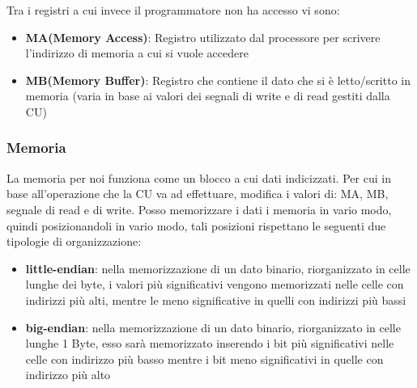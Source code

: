 Tra i registri a cui invece il programmatore non ha accesso vi sono:
\begin{itemize}
    \item \textbf{MA(Memory Access)}: Registro utilizzato dal processore per scrivere l'indirizzo di memoria a cui si vuole accedere
    \item \textbf{MB(Memory Buffer)}: Registro che contiene il dato che si è letto/scritto in memoria (varia in base ai valori dei segnali di write e di read gestiti dalla CU)
\end{itemize}

\subsubsection{Memoria}
La memoria per noi funziona come un blocco a cui dati indicizzati. Per cui in base all'operazione che la CU va ad effettuare, modifica i valori di: MA, MB, segnale di read e di write.
Posso memorizzare i dati i memoria in vario modo, quindi posizionandoli in vario modo, tali posizioni rispettano le seguenti due tipologie di organizzazione:
\begin{itemize}
    \item \textbf{little-endian}: nella memorizzazione di un dato binario, riorganizzato in celle lunghe dei byte, i valori più significativi vengono memorizzati nelle celle con indirizzi più alti, mentre le meno significative in quelli con indirizzi più bassi
    \item \textbf{big-endian}: nella memorizzazione di un dato binario, riorganizzato in celle lunghe 1 Byte, esso sarà memorizzato inserendo i bit più significativi nelle celle con indirizzo più basso mentre i bit meno significativi in quelle con indirizzo più alto
\end{itemize}

